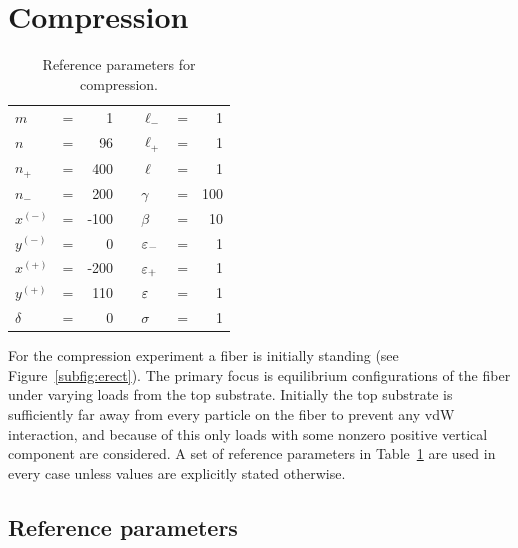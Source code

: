{\section{Compression}

	\begin{table}[th]
		\centering
		\caption{Reference parameters for compression.\label{table:compression_reference}}
		\begin{tabular}{lcrclcr}
			$m$ & = & 1 & \hspace{1in} & $\ell_-$ & = & 1 \\
			$n$ & = & 96 & & $\ell_+$ & = & 1 \\
			$n_+$ & = & 400 & & $\ell$ & = & 1 \\
			$n_-$ & = & 200 & & $\gamma$ & = & 100 \\
			$x^{(-)}$ & = & -100 & & $\beta$ & = & 10 \\
			$y^{(-)}$ & = & 0 & & $\varepsilon_-$ & = & 1 \\
			$x^{(+)}$ & = & -200 & & $\varepsilon_+$ & = & 1 \\
			$y^{(+)}$ & = & 110 & & $\varepsilon$ & = & 1 \\
			$\delta$ & = & 0 & & $\sigma$ & = & 1
		\end{tabular}
	\end{table}
For the compression experiment a fiber is initially standing (see Figure~\ref{subfig:erect}). The primary focus is equilibrium configurations of the fiber under varying loads from the top substrate. Initially the top substrate is sufficiently far away from every particle on the fiber to prevent any vdW interaction, and because of this only loads with some nonzero positive vertical component are considered. A set of reference parameters in Table~\ref{table:compression_reference} are used in every case unless values are explicitly stated otherwise.

\subsection{Reference parameters}

}
